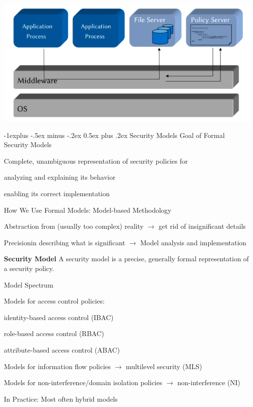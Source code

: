 \documentclass[a4paper]{article}
\makeatletter
\renewcommand{\note}[2]{\begin{noteBox} \textbf{#1} #2 \end{noteBox}}
\renewcommand{\subsection}{\@startsection{subsection}{2}{0mm}%
                                {-1explus -.5ex minus -.2ex}%
                                {0.5ex plus .2ex}%
                                {\normalfont\normalsize\bfseries}}
\makeatother
\begin{document}
\begin{multicols}{3}
    \includegraphics[width=.5\linewidth]{Assets/Systemsicherheit-application-embedded-policy.png}

    \subsection{Security Models}
    Goal of Formal Security Models
    \begin{itemize*}
        \item Complete, unambiguous representation of security policies for
        \item analyzing and explaining its behavior
        \item enabling its correct implementation
    \end{itemize*}

    How We Use Formal Models: Model-based Methodology
    \begin{itemize*}
        \item Abstraction from (usually too complex) reality $\rightarrow$ get rid of insignificant details
        \item Precisionin describing what is significant $\rightarrow$ Model analysis and implementation
    \end{itemize*}

    \note{Security Model}{A security model is a precise, generally formal representation of a security policy.}

    Model Spectrum
    \begin{itemize*}
        \item Models for access control policies:
        \begin{itemize*}
            \item identity-based access control (IBAC)
            \item role-based access control (RBAC)
            \item attribute-based access control (ABAC)
        \end{itemize*}
        \item Models for information flow policies $\rightarrow$ multilevel security (MLS)
        \item Models for non-interference/domain isolation policies $\rightarrow$ non-interference (NI)
        \item In Practice: Most often hybrid models
    \end{itemize*}


\end{multicols}
\end{document}
